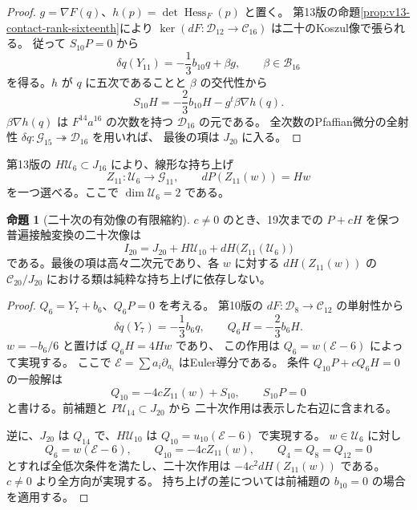 \documentclass[a4paper,11pt]{ltjsarticle}
\theoremstyle{definition}
\newtheorem{theorem}{命題}[section]
\begin{document}
\begin{proof}
$g=\nabla F(q)$、$h(p)=\det\operatorname{Hess}_F(p)$ と置く。
第13版の命題\ref{prop:v13-contact-rank-sixteenth}により
$\ker(dF:\mathcal D_{12}\to\mathcal C_{16})$ は二十のKoszul像で張られる。
従って $S_{10}P=0$ から
\[
 \delta q(Y_{11})=-\frac13b_{10}q+\beta g,
 \qquad \beta\in\mathcal B_{16}
\]
を得る。$h$ が $q$ に五次であることと $\beta$ の交代性から
\[
 S_{10}H=-\frac23b_{10}H-g^t\beta\nabla h(q).
\]
$\beta\nabla h(q)$ は $F^{14}a^{16}$ の次数を持つ
$\mathcal D_{16}$ の元である。
全次数のPfaffian微分の全射性
$\delta q:\mathcal G_{15}\twoheadrightarrow\mathcal D_{16}$ を用いれば、
最後の項は $J_{20}$ に入る。
\end{proof}

第13版の $H\mathcal U_6\subset J_{16}$ により、線形な持ち上げ
\[
 Z_{11}:\mathcal U_6\longrightarrow\mathcal G_{11},\qquad
 dP(Z_{11}(w))=Hw
\]
を一つ選べる。ここで $\dim\mathcal U_6=2$ である。

\begin{theorem}[二十次の有効像の有限縮約]
\label{thm:v15-effective-twentieth}
$c\ne0$ のとき、19次までの $P+cH$ を保つ普遍接触変換の二十次像は
\begin{equation}\label{eq:v15-effective-image}
 I_{20}=J_{20}+H\mathcal U_{10}
             +dH\bigl(Z_{11}(\mathcal U_6)\bigr)
\end{equation}
である。最後の項は高々二次元であり、各 $w$ に対する
$dH(Z_{11}(w))$ の $\mathcal C_{20}/J_{20}$ における類は純粋な持ち上げに依存しない。
\end{theorem}

\begin{proof}
$Q_6=Y_7+b_6$、$Q_6P=0$ を考える。
第10版の $dF:\mathcal D_8\to\mathcal C_{12}$ の単射性から
\[
 \delta q(Y_7)=-\frac13b_6q,\qquad Q_6H=-\frac23b_6H.
\]
$w=-b_6/6$ と置けば $Q_6H=4Hw$ であり、
この作用は $Q_6=w(\mathcal E-6)$ によって実現する。
ここで $\mathcal E=\sum a_i\partial_{a_i}$ はEuler導分である。
条件 $Q_{10}P+cQ_6H=0$ の一般解は
\[
 Q_{10}=-4cZ_{11}(w)+S_{10},\qquad S_{10}P=0
\]
と書ける。前補題と $P\mathcal U_{14}\subset J_{20}$ から
二十次作用は表示した右辺に含まれる。

逆に、$J_{20}$ は $Q_{14}$ で、$H\mathcal U_{10}$ は
$Q_{10}=u_{10}(\mathcal E-6)$ で実現する。
$w\in\mathcal U_6$ に対し
\[
 Q_6=w(\mathcal E-6),\qquad Q_{10}=-4cZ_{11}(w),
 \qquad Q_4=Q_8=Q_{12}=0
\]
とすれば全低次条件を満たし、二十次作用は $-4c^2dH(Z_{11}(w))$ である。
$c\ne0$ より全方向が実現する。
持ち上げの差については前補題の $b_{10}=0$ の場合を適用する。
\end{proof}
\end{document}
